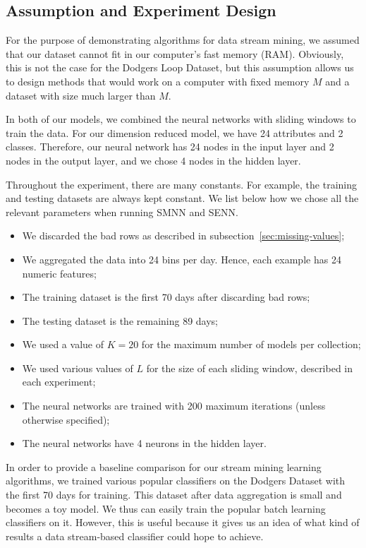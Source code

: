 \documentclass[conference]{IEEEtran}
\begin{document}
		\subsection{Assumption and Experiment Design}
		For the purpose of demonstrating algorithms for data stream mining, we assumed that our dataset cannot fit in our computer's fast memory (RAM). Obviously, this is not the case for the Dodgers Loop Dataset, but this assumption allows us to design methods that would work on a computer with fixed memory $M$ and a dataset with size much larger than $M$.
		
		In both of our models, we combined the neural networks with sliding windows to train the data. For our dimension reduced model, we have 24 attributes and 2 classes. Therefore, our neural network has 24 nodes in the input layer and 2 nodes in the output layer, and we chose 4 nodes in the hidden layer. 
		
		Throughout the experiment, there are many constants. For example, the training and testing datasets are always kept constant. We list below how we chose all the relevant parameters when running SMNN and SENN. 
		\begin{itemize}
			\item We discarded the bad rows as described in subsection~\ref{sec:missing-values};
			\item We aggregated the data into 24 bins per day. Hence, each example has 24 numeric features;
			\item The training dataset is the first 70 days after discarding bad rows;
			\item The testing dataset is the remaining 89 days;
			\item We used a value of $K=20$ for the maximum number of models per collection;
			\item We used various values of $L$ for the size of each sliding window, described in each experiment;
			\item The neural networks are trained with 200 maximum iterations (unless otherwise specified);
			\item The neural networks have 4 neurons in the hidden layer.
		\end{itemize}
		
		In order to provide a baseline comparison for our stream mining learning algorithms, we trained various popular classifiers on the Dodgers Dataset with the first 70 days for training. This dataset after data aggregation is small and becomes a toy model. We thus can easily train the popular batch learning classifiers on it. However, this is useful because it gives us an idea of what kind of results a data stream-based classifier could hope to achieve.
		
\end{document}
